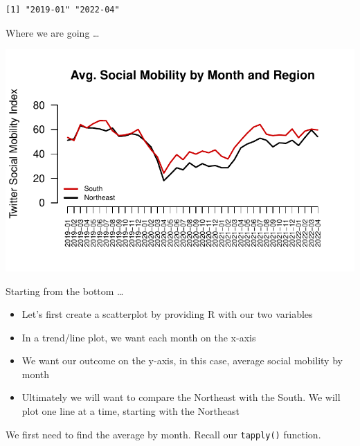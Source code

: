 \documentclass[
  letterpaper,
  DIV=11,
  numbers=noendperiod]{scrreprt}
\newenvironment{Shaded}{\begin{snugshade}}{\end{snugshade}}
\newcommand{\AttributeTok}[1]{\textcolor[rgb]{0.40,0.45,0.13}{#1}}
\newcommand{\FunctionTok}[1]{\textcolor[rgb]{0.28,0.35,0.67}{#1}}
\newcommand{\NormalTok}[1]{\textcolor[rgb]{0.00,0.23,0.31}{#1}}
\newcommand{\OtherTok}[1]{\textcolor[rgb]{0.00,0.23,0.31}{#1}}
\newcommand{\SpecialCharTok}[1]{\textcolor[rgb]{0.37,0.37,0.37}{#1}}
\providecommand{\tightlist}{%
  \setlength{\itemsep}{0pt}\setlength{\parskip}{0pt}}\usepackage{longtable,booktabs,array}
\begin{document}
\begin{verbatim}
[1] "2019-01" "2022-04"
\end{verbatim}

Where we are going \ldots{}

\includegraphics{05-Causalityii_files/figure-pdf/unnamed-chunk-8-1.pdf}

Starting from the bottom \ldots{}

\begin{itemize}
\tightlist
\item
  Let's first create a scatterplot by providing R with our two variables
\item
  In a trend/line plot, we want each month on the x-axis
\item
  We want our outcome on the y-axis, in this case, average social
  mobility by month
\item
  Ultimately we will want to compare the Northeast with the South. We
  will plot one line at a time, starting with the Northeast
\end{itemize}

We first need to find the average by month. Recall our \texttt{tapply()}
function.

\begin{Shaded}
\end{Shaded}
\end{document}
